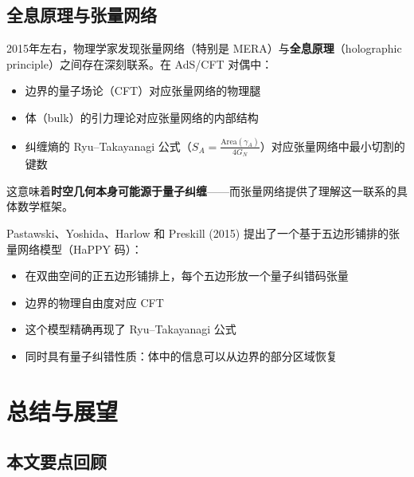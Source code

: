 \documentclass[12pt,a4paper]{ctexart}
\begin{document}
\subsection{全息原理与张量网络}

2015年左右，物理学家发现张量网络（特别是 MERA）与\textbf{全息原理}（holographic principle）之间存在深刻联系。在 AdS/CFT 对偶中：
\begin{itemize}
    \item 边界的量子场论（CFT）对应张量网络的物理腿
    \item 体（bulk）的引力理论对应张量网络的内部结构
    \item 纠缠熵的 Ryu--Takayanagi 公式（$S_A = \frac{\text{Area}(\gamma_A)}{4G_N}$）对应张量网络中最小切割的键数
\end{itemize}

这意味着\textbf{时空几何本身可能源于量子纠缠}——而张量网络提供了理解这一联系的具体数学框架。

\begin{examplebox}
Pastawski、Yoshida、Harlow 和 Preskill (2015) 提出了一个基于五边形铺排的张量网络模型（HaPPY 码）：
\begin{itemize}
    \item 在双曲空间的正五边形铺排上，每个五边形放一个量子纠错码张量
    \item 边界的物理自由度对应 CFT
    \item 这个模型精确再现了 Ryu--Takayanagi 公式
    \item 同时具有量子纠错性质：体中的信息可以从边界的部分区域恢复
\end{itemize}
\end{examplebox}

\section{总结与展望}

\subsection{本文要点回顾}
\end{document}

